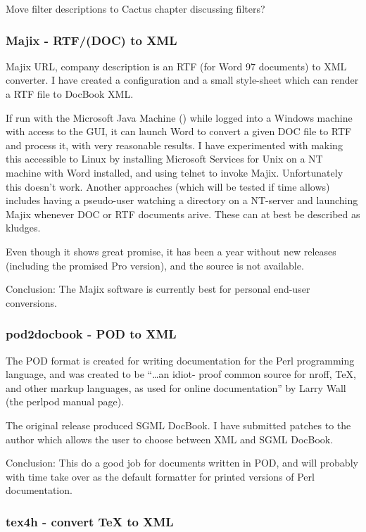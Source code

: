 \textsf{Move filter descriptions to Cactus chapter discussing
  filters?} 
\subsubsection{Majix - RTF/(DOC) to XML}

Majix \textsf{URL, company description} is an RTF (for Word 97
documents) to XML converter.  I have created a configuration and a
small style-sheet which can render a RTF file to DocBook XML.

If run with the Microsoft Java Machine () while logged
into a Windows machine with access to the GUI, it can launch Word to
convert a given DOC file to RTF and process it, with very reasonable
results.  I have experimented with making this accessible to Linux by
installing Microsoft Services for Unix on a NT machine with Word
installed, and using telnet to invoke Majix.  Unfortunately this
doesn't work.  Another approaches (\textsf{which will be tested if
  time allows}) includes having a pseudo-user watching a directory on
a NT-server and launching Majix whenever DOC or RTF documents arive.
These can at best be described as kludges.

Even though it shows great promise, it has been a year without new
releases (including the promised Pro version), and the source is not
available. 

Conclusion: The Majix software is currently best for personal end-user
conversions.


\subsubsection{pod2docbook - POD to XML}

The POD format is created for writing documentation for the Perl
programming language, and was created to be ``\ldots an idiot- proof
common source for nroff, TeX, and other markup languages, as used for
online documentation'' by Larry Wall (\textsf{the perlpod manual
  page}).
       
The original release produced SGML DocBook.  I have submitted patches
to the author which allows the user to choose between XML and SGML
DocBook.

Conclusion:  This do a good job for documents written in POD, and will
probably with time take over as the default formatter for printed
versions of Perl documentation.

\subsubsection{tex4h - convert {\TeX} to XML}


